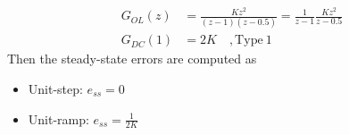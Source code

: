 \documentclass[twoside]{article}
\begin{document}
%
\begin{align*}
G_{OL}(z) &= \frac{K z^2}{(z-1) (z-0.5)} = \frac{1}{z-1} \frac{K
            z^2}{z - 0.5}
\\
G_{DC}(1) &= 2 K \quad, \mathrm{Type} \ 1 
\end{align*}
%
Then the steady-state errors are computed as
%
\begin{itemize}
\item Unit-step: $e_{ss} = 0$
\item Unit-ramp: $e_{ss} = \frac{1}{2 K}$
\end{itemize}


\end{document}
